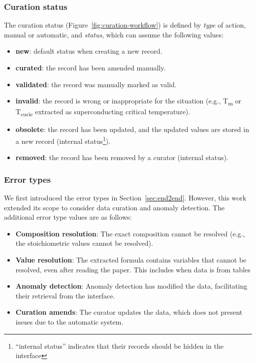 \subsubsection{Curation status} 
\label{subsec:curation-status}
The curation status (Figure~\ref{fig:curation-workflow}) is defined by \emph{type} of action, manual or automatic, and \emph{status}, which can assume the following values: 
\begin{itemize}
    \item \textbf{new}: default status when creating a new record.
    \item \textbf{curated}: the record has been amended manually.
    \item \textbf{validated}: the record was manually marked as valid.
    \item \textbf{invalid}: the record is wrong or inappropriate for the situation (e.g., T\textsubscript{m} or T\textsubscript{curie} extracted as superconducting critical temperature).
    \item \textbf{obsolete}: the record has been updated, and the updated values are stored in a new record (internal status\footnote{``internal status'' indicates that their records should be hidden in the interface}).
    \item \textbf{removed}: the record has been removed by a curator (internal status).
\end{itemize} 
    

\subsubsection{Error types}
\label{subsec:error-types}
We first introduced the error types in Section~\ref{sec:end2end}. However, this work extended its scope to consider data curation and anomaly detection. 
The additional error type values are as follows: 

\begin{itemize}
    \item \textbf{Composition resolution}: The exact composition cannot be resolved (e.g., the stoichiometric values cannot be resolved).
    \item \textbf{Value resolution}: The extracted formula contains variables that cannot be resolved, even after reading the paper. This includes when data is from tables
    \item \textbf{Anomaly detection}: Anomaly detection has modified the data, facilitating their retrieval from the interface.
    \item \textbf{Curation amends}: The curator updates the data, which does not present issues due to the automatic system.
\end{itemize}

